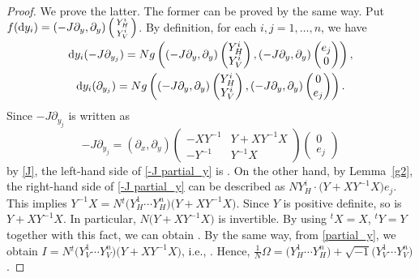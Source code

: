 \documentclass[pdftex]{sigma}
\numberwithin{equation}{section}
\begin{document}
\begin{proof}
We prove the latter. The former can be proved by the same way.
Put $f({\rm d}y_i)=\smash{(-J\partial_y, \partial_y)
\left(\begin{smallmatrix}
Y^i_H \\
Y^i_V
\end{smallmatrix}\right)}$. By definition, for each $i, j=1,\ldots ,n$, we have
\begin{gather}
{\rm d}y_i(-J\partial_{y_j})=Ng\left((-J\partial_y, \partial_y)
\begin{pmatrix}
Y^i_H \\
Y^i_V
\end{pmatrix},
(-J\partial_y, \partial_y)
\begin{pmatrix}
e_j \\
0
\end{pmatrix}
\right), \label{-J partial_y}\\
{\rm d}y_i(\partial_{y_j})=Ng\left((-J\partial_y, \partial_y)
\begin{pmatrix}
Y^i_H \\
Y^i_V
\end{pmatrix},
(-J\partial_y, \partial_y)
\begin{pmatrix}
0 \\
e_j
\end{pmatrix}
\right). \label{partial_y}
\end{gather}
Since $-J\partial_{y_j}$ is written as
\[
-J\partial_{y_j}=(\partial_x, \partial_y)
\begin{pmatrix}
-XY^{-1} & Y+XY^{-1}X \\
-Y^{-1} & Y^{-1}X
\end{pmatrix}
\begin{pmatrix}
0 \\
e_j
\end{pmatrix}
\]
by \eqref{J}, the left-hand side of \eqref{-J partial_y} is . On the other hand, by Lemma~\ref{g2}, the right-hand side of \eqref{-J partial_y} can be described as $NY^i_H\cdot \bigl(Y+XY^{-1}X\bigr)e_j$. This implies $Y^{-1}X=N{}^t\bigl(Y^1_H\cdots Y^n_H\bigr)\bigl(Y+XY^{-1}X\bigr)$. Since $Y$ is positive definite, so is $Y+XY^{-1}X$. In particular, $N\bigl(Y+XY^{-1}X\bigr)$ is invertible. By using ${}^tX=X$, ${}^tY=Y$ together with this fact, we can obtain . By the same way, from \eqref{partial_y}, we obtain $I=N{}^t\bigl(Y^1_V\cdots Y^n_V\bigr)\bigl(Y+XY^{-1}X\bigr)$, i.e., . Hence, $\frac{1}{N}\Omega=\bigl(Y^1_H\cdots Y^n_H\bigr)+\sqrt{-1}\bigl(Y^1_V\cdots Y^n_V\bigr)$.
\end{proof}
\end{document}
